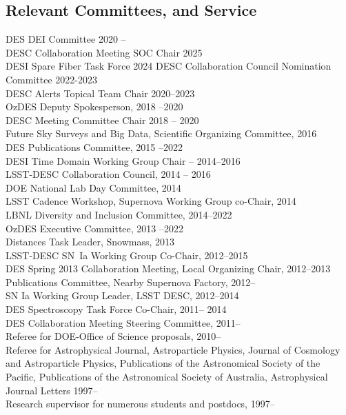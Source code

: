 \documentclass[line, margin]{res}
\begin{document}
\begin{resume}
\section{Relevant Committees, and Service}
DES DEI Committee 2020 --\\
DESC Collaboration Meeting SOC Chair 2025\\
DESI Spare Fiber Task Force 2024
DESC Collaboration Council Nomination Committee 2022-2023\\
DESC Alerts Topical Team Chair 2020--2023 \\
OzDES Deputy Spokesperson, 2018 --2020\\
DESC Meeting Committee Chair 2018 -- 2020\\
Future Sky Surveys and Big Data, Scientific Organizing Committee, 2016\\
DES Publications Committee, 2015 --2022\\
DESI Time Domain Working Group Chair -- 2014--2016\\
LSST-DESC Collaboration Council, 2014 -- 2016\\
DOE National Lab Day Committee, 2014\\
LSST Cadence Workshop, Supernova Working Group co-Chair, 2014\\
LBNL Diversity and Inclusion Committee, 2014--2022 \\
OzDES Executive Committee, 2013 --2022 \\
Distances Task Leader, Snowmass, 2013\\
LSST-DESC SN~Ia Working Group Co-Chair, 2012--2015\\
DES Spring 2013 Collaboration Meeting, Local Organizing Chair, 2012--2013\\
Publications Committee, Nearby Supernova Factory, 2012--\\
SN Ia Working Group Leader, LSST DESC, 2012--2014\\
DES Spectroscopy Task Force Co-Chair, 2011-- 2014\\
DES Collaboration Meeting Steering Committee, 2011--\\
Referee for DOE-Office of Science proposals, 2010-- \\
Referee for Astrophysical Journal, Astroparticle Physics, Journal of Cosmology and Astroparticle Physics, Publications of the Astronomical Society of the Pacific, Publications of the Astronomical Society of Australia, Astrophysical Journal Letters 1997--\\
Research supervisor for numerous students and postdocs, 1997--\\

\end{resume}
\end{document}
